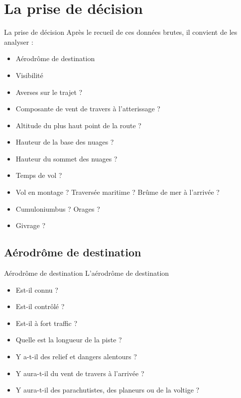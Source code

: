 \documentclass{beamer}
\begin{document}
\section{La prise de décision}
\begin{frame}{La prise de décision}
  Après le recueil de ces données brutes, il convient de les analyser :

  \begin{itemize}
    \item Aérodrôme de destination \pause 
    \item Visibilité
    \item Averses sur le trajet ? \pause 
    \item Composante de vent de travers à l'atterissage ? \pause
    \item Altitude du plus haut point de la route ? \pause
    \item Hauteur de la base des nuages ? \pause
    \item Hauteur du sommet des nuages ? \pause
    \item Temps de vol ?
    \item Vol en montage ? \pause Traversée maritime ? \pause Brûme de mer à l'arrivée ?\pause
    \item Cumuloniumbus ? \pause Orages ? \pause
    \item Givrage ?
  \end{itemize}
\end{frame}

\subsection{Aérodrôme de destination}
\begin{frame}{Aérodrôme de destination}
  L'aérodrôme de destination

  \begin{itemize}
    \item Est-il connu ? \pause
    \item Est-il contrôlé ? \pause
    \item Est-il à fort traffic ? \pause
    \item Quelle est la longueur de la piste ? \pause
    \item Y a-t-il des relief et dangers alentours ? \pause
    \item Y aura-t-il du vent de travers à l'arrivée ? \pause
    \item Y aura-t-il des parachutistes, des planeurs ou de la voltige ?
  \end{itemize}
\end{frame}
\end{document}

